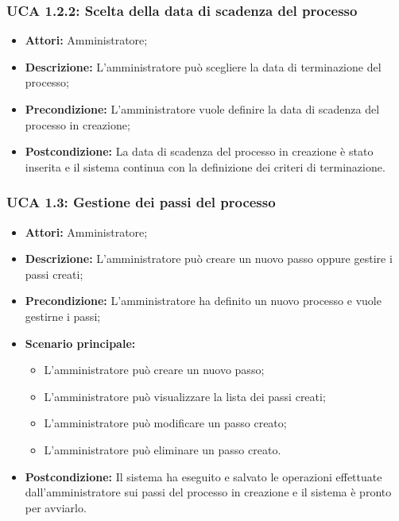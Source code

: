\hypertarget{A1.2.2}{}
\subsubsection{UCA 1.2.2: Scelta della data di scadenza del processo}
\begin{itemize}
\item \textbf{Attori:}
 Amministratore;
\item \textbf{Descrizione:}
 L'amministratore può scegliere la data di terminazione del processo;
\item \textbf{Precondizione:}
 L'amministratore vuole definire la data di scadenza del processo in creazione;
\item \textbf{Postcondizione:}
 La data di scadenza del processo in creazione è stato inserita e il sistema continua con la definizione dei criteri di terminazione.
\end{itemize}

\hypertarget{A1.3}{}
\subsubsection{UCA 1.3: Gestione dei passi del processo}
\begin{itemize}
\item \textbf{Attori:}
 Amministratore;
\item \textbf{Descrizione:} 
L'amministratore può creare un nuovo passo oppure gestire i passi creati;
\item \textbf{Precondizione:} 
L'amministratore ha definito un nuovo processo e vuole gestirne i passi;
\item \textbf{Scenario principale:} 
\begin{itemize}
\item L'amministratore può creare un nuovo passo;
\item L'amministratore può visualizzare la lista dei passi creati;
\item L'amministratore può modificare un passo creato;
\item L'amministratore può eliminare un passo creato.
\end{itemize}
\item \textbf{Postcondizione:} 
Il sistema ha eseguito e salvato le operazioni effettuate dall'amministratore sui passi del processo in creazione e il sistema è pronto per avviarlo.
\end{itemize}

